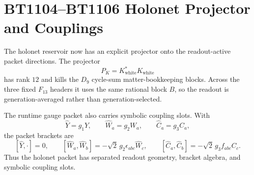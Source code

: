 \section{BT1104--BT1106 Holonet Projector and Couplings}
\label{sec:bt1104-bt1106-holonet-projector-coupling-report}

The holonet reservoir now has an explicit projector onto the readout-active packet directions.  The projector
\[
P_K=K_{\mathrm{white}}^*K_{\mathrm{white}}
\]
has rank $12$ and kills the $D_9$ cycle-sum matter-bookkeeping blocks.  Across the three fixed $F_{13}$ headers it uses the same rational block $B$, so the readout is generation-averaged rather than generation-selected.

The runtime gauge packet also carries symbolic coupling slots.  With
\[
\widehat Y=g_1Y,
\qquad
\widehat W_a=g_2W_a,
\qquad
\widehat C_a=g_3C_a,
\]
the packet brackets are
\[
[\widehat Y,\cdot]=0,
\qquad
[\widehat W_a,\widehat W_b]=-\sqrt2\,g_2\epsilon_{abc}\widehat W_c,
\qquad
[\widehat C_a,\widehat C_b]=-\sqrt2\,g_3f_{abc}\widehat C_c.
\]
Thus the holonet packet has separated readout geometry, bracket algebra, and symbolic coupling slots.

